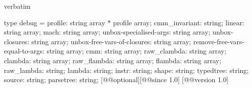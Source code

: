 \begin{camlexample}{verbatim}
\begin{caml}
\begin{camlinput}
type debug = {
  profile: string array * profile array;
  cmm_invariant: string;
  linear: string array;
  mach: string array;
  unbox-specialised-args: string array;
  unbox-closures: string array;
  unbox-free-vars-of-closures: string array;
  remove-free-vars-equal-to-args: string array;
  cmm: string array;
  raw_clambda: string array;
  clambda: string array;
  raw_flambda: string array;
  flambda: string array;
  raw_lambda: string;
  lambda: string;
  instr: string;
  shape: string;
  typedtree: string;
  source: string;
  parsetree: string;
} [@@optional][@@since 1.0]
[@@version 1.0]
\end{camlinput}
\end{caml}
\end{camlexample}
